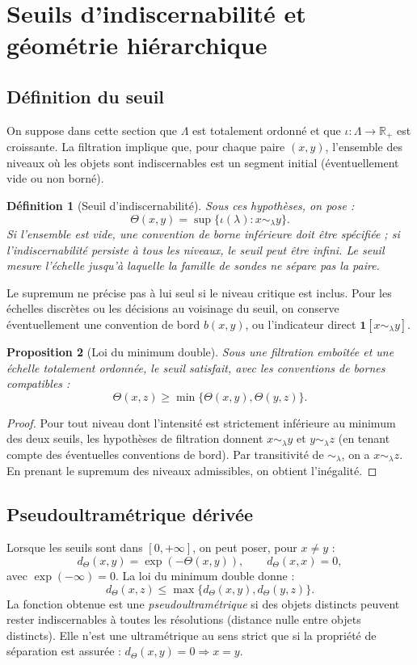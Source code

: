 \documentclass[11pt,a4paper]{article}
\newtheorem{definition}{Définition}[section]
\newtheorem{proposition}[definition]{Proposition}
\theoremstyle{remark}
\newcommand{\R}{\mathbb R}
\newcommand{\Lam}{\Lambda}
\newcommand{\Thresh}{\Theta}
\newcommand{\1}{\mathbf 1}
\begin{document}
\section{Seuils d'indiscernabilité et géométrie hiérarchique}

\subsection{Définition du seuil}
On suppose dans cette section que $\Lam$ est totalement ordonné et que $\iota:\Lam\to\R_+$ est croissante. La filtration implique que, pour chaque paire $(x,y)$, l'ensemble des niveaux où les objets sont indiscernables est un segment initial (éventuellement vide ou non borné).

\begin{definition}[Seuil d'indiscernabilité]
Sous ces hypothèses, on pose :
\[
\Thresh(x,y)=\sup\{\iota(\lambda):x\sim_\lambda y\}.
\]
Si l'ensemble est vide, une convention de borne inférieure doit être spécifiée ; si l'indiscernabilité persiste à tous les niveaux, le seuil peut être infini. Le seuil mesure l'échelle jusqu'à laquelle la famille de sondes ne sépare pas la paire.
\end{definition}

Le supremum ne précise pas à lui seul si le niveau critique est inclus. Pour les échelles discrètes ou les décisions au voisinage du seuil, on conserve éventuellement une convention de bord $b(x,y)$, ou l'indicateur direct $\1[x\sim_\lambda y]$.

\begin{proposition}[Loi du minimum double]
Sous une filtration emboîtée et une échelle totalement ordonnée, le seuil satisfait, avec les conventions de bornes compatibles :
\[
\boxed{\Thresh(x,z)\geq\min\{\Thresh(x,y),\Thresh(y,z)\}.}
\]
\end{proposition}
\begin{proof}
Pour tout niveau dont l'intensité est strictement inférieure au minimum des deux seuils, les hypothèses de filtration donnent $x\sim_\lambda y$ et $y\sim_\lambda z$ (en tenant compte des éventuelles conventions de bord). Par transitivité de $\sim_\lambda$, on a $x\sim_\lambda z$. En prenant le supremum des niveaux admissibles, on obtient l'inégalité.
\end{proof}

\subsection{Pseudoultramétrique dérivée}
Lorsque les seuils sont dans $[0,+\infty]$, on peut poser, pour $x\neq y$ :
\[
d_\Theta(x,y)=\exp(-\Thresh(x,y)),\qquad d_\Theta(x,x)=0,
\]
avec $\exp(-\infty)=0$. La loi du minimum double donne :
\[
\boxed{d_\Theta(x,z)\leq\max\{d_\Theta(x,y),d_\Theta(y,z)\}.}
\]
La fonction obtenue est une \emph{pseudoultramétrique} si des objets distincts peuvent rester indiscernables à toutes les résolutions (distance nulle entre objets distincts). Elle n'est une ultramétrique au sens strict que si la propriété de séparation est assurée : $d_\Theta(x,y)=0\Rightarrow x=y$.
\end{document}
